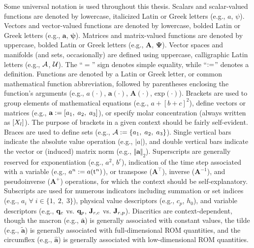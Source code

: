 Some universal notation is used throughout this thesis. Scalars and scalar-valued functions are denoted by lowercase, italicized Latin or Greek letters (e.g., $a$, $\psi$). Vectors and vector-valued functions are denoted by lowercase, bolded Latin or Greek letters (e.g., $\mathbf{a}$, $\boldsymbol{\psi}$). Matrices and matrix-valued functions are denoted by uppercase, bolded Latin or Greek letters (e.g., $\mathbf{A}$, $\boldsymbol{\Psi}$). Vector spaces and manifolds (and sets, occasionally) are defined using uppercase, calligraphic Latin letters (e.g., $\mathcal{A}$, $\mathcal{U}$). The ``$=$'' sign denotes simple equality, while ``$:=$'' denotes a definition. Functions are denoted by a Latin or Greek letter, or common mathematical function abbreviation, followed by parentheses enclosing the function's arguments (e.g., $a(\cdot)$, $\mathbf{a}(\cdot)$, $\mathbf{A}(\cdot)$, $\text{exp}(\cdot)$). Brackets are used to group elements of mathematical equations (e.g., $a + [b + c]^2$), define vectors or matrices (e.g., $\mathbf{a} := [a_1, \; a_2, \; a_3]$), or specify molar concentration (always written as $[X_{l}]$). The purpose of brackets in a given context should be fairly self-evident. Braces are used to define sets (e.g., $\mathcal{A} := \{a_1,\; a_2,\; a_3\}$). Single vertical bars indicate the absolute value operation (e.g., $|a|$), and double vertical bars indicate the vector or (induced) matrix norm (e.g., $\Vert \mathbf{a} \Vert_2$). Superscripts are generally reserved for exponentiation (e.g., $a^2$, $b^c$), indication of the time step associated with a variable (e.g., $a^{n} := a(\text{t}^{n})$), or transpose ($\mathbf{A}^\top$), inverse ($\mathbf{A}^{-1}$), and pseudoinverse ($\mathbf{A}^+$) operations, for which the context should be self-explanatory. Subscripts are used for numerous indicators including summation or set indices (e.g., $a_{i} \; \forall \; i \in \{1,\; 2,\; 3\}$), physical value descriptors (e.g., $c_p$, $h_0$), and variable descriptors (e.g., $\mathbf{q}_{c}$ vs. $\mathbf{q}_{p}$, $\mathbf{J}_{r,c}$ vs. $\mathbf{J}_{r,p}$). Diacritics are context-dependent, though the macron (e.g., $\mathbf{\overline{a}}$) is generally associated with constant values, the tilde (e.g., $\mathbf{\widetilde{a}}$) is generally associated with full-dimensional ROM quantities, and the circumflex (e.g., $\mathbf{\widehat{a}}$) is generally associated with low-dimensional ROM quantities.